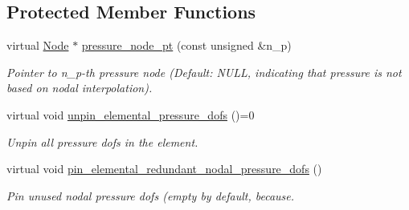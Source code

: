\subsection*{Protected Member Functions}
\begin{DoxyCompactItemize}
\item 
virtual \hyperlink{classoomph_1_1Node}{Node} $\ast$ \hyperlink{classoomph_1_1RefineableGeneralisedNewtonianAxisymmetricNavierStokesEquations_a626f83e867f6d2fda5d9ed20a265c6ca}{pressure\+\_\+node\+\_\+pt} (const unsigned \&n\+\_\+p)
\begin{DoxyCompactList}\small\item\em Pointer to n\+\_\+p-\/th pressure node (Default\+: N\+U\+LL, indicating that pressure is not based on nodal interpolation). \end{DoxyCompactList}\item 
virtual void \hyperlink{classoomph_1_1RefineableGeneralisedNewtonianAxisymmetricNavierStokesEquations_adec2514256f89cd8ff2694abd8178675}{unpin\+\_\+elemental\+\_\+pressure\+\_\+dofs} ()=0
\begin{DoxyCompactList}\small\item\em Unpin all pressure dofs in the element. \end{DoxyCompactList}\item 
virtual void \hyperlink{classoomph_1_1RefineableGeneralisedNewtonianAxisymmetricNavierStokesEquations_a1402cf618786a821b31ea44a636acde9}{pin\+\_\+elemental\+\_\+redundant\+\_\+nodal\+\_\+pressure\+\_\+dofs} ()
\begin{DoxyCompactList}\small\item\em Pin unused nodal pressure dofs (empty by default, because. \end{DoxyCompactList}\end{DoxyCompactItemize}
